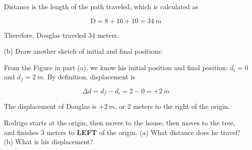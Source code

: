 \documentclass[main.tex]{subfiles}
\begin{document}
Distance is the length of the path traveled, which is calculated as

\begin{equation*}
    \mathrm{D} = 8 + 16 + 10 = \SI{34}{m}
\end{equation*}

Therefore, Douglas traveled 34 meters.

\vspace{1ex}

(b) Draw another sketch of initial and final positions:

\begin{center}
\end{center}

From the Figure in part (a), we know his initial position and final position: $d_i = 0$ and $d_f = \SI{2}{m}$. By definition, displacement is

\begin{equation*}
    \Delta{d} = d_f - d_i = 2 - 0 = +\SI{2}{m}
\end{equation*}

The displacement of Douglas is $+\SI{2}{m}$, or 2 meters to the right of the origin.

\solutionEnd

\vspace{1em}


\begin{example} \label{4Li1vK}
Rodrigo starts at the origin, then moves to the house, then moves to the tree, and finishes 3 meters to \textbf{LEFT} of the origin. (a) What distance does he travel? (b) What is his displacement?
\end{example}
\end{document}
